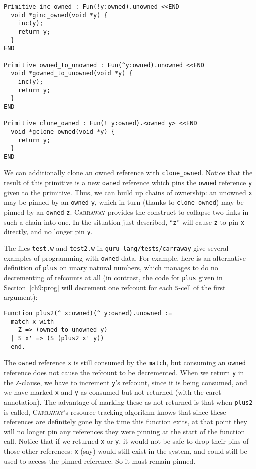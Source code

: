 \documentclass{book}[12pt]
\newcommand{\carraway}[0]{\textsc{Carraway}\xspace}
\begin{document}
\begin{verbatim}
Primitive inc_owned : Fun(!y:owned).unowned <<END
  void *ginc_owned(void *y) {
    inc(y);
    return y;
  }
END

Primitive owned_to_unowned : Fun(^y:owned).unowned <<END
  void *gowned_to_unowned(void *y) {
    inc(y);
    return y;
  }
END

Primitive clone_owned : Fun(! y:owned).<owned y> <<END
  void *gclone_owned(void *y) {
    return y;
  }
END
\end{verbatim}

\noindent 
We can additionally clone an owned reference with
\texttt{clone\_owned}.  Notice that the result of this primitive is a
new \texttt{owned} reference which pins the \texttt{owned} reference
\texttt{y} given to the primitive.  Thus, we can build up chains of
ownership: an unowned \texttt{x} may be pinned by an \texttt{owned}
\texttt{y}, which in turn (thanks to \texttt{clone\_owned}) may be
pinned by an \texttt{owned} \texttt{z}.  \carraway provides the \@
construct to collapse two links in such a chain into one.  In the
situation just described, ``\@ \texttt{z}'' will cause \texttt{z} to
pin \texttt{x} directly, and no longer pin \texttt{y}.

The files \texttt{test.w} and \texttt{test2.w} in
\texttt{guru-lang/tests/carraway} give several examples of programming
with \texttt{owned} data.  For example, here is an alternative
definition of \texttt{plus} on unary natural numbers, which manages to
do no decrementing of refcounts at all (in contrast, the code for
\texttt{plus} given in Section~\ref{ch9:prog} will decrement one
refcount for each \texttt{S}-cell of the first argument):

\begin{verbatim}
Function plus2(^ x:owned)(^ y:owned).unowned :=
  match x with
    Z => (owned_to_unowned y)
  | S x' => (S (plus2 x' y))
  end.
\end{verbatim}

\noindent The \texttt{owned} reference \texttt{x} is still consumed by
the \texttt{match}, but consuming an \texttt{owned} reference does not
cause the refcount to be decremented.  When we return \texttt{y} in
the \texttt{Z}-clause, we have to increment \texttt{y}'s refcount,
since it is being consumed, and we have marked \texttt{x} and
\texttt{y} as consumed but not returned (with the caret annotation).
The advantage of marking these as not returned is that when
\texttt{plus2} is called, \carraway's resource tracking algorithm
knows that since these references are definitely gone by the time this
function exits, at that point they will no longer pin any references
they were pinning at the start of the function call.  Notice that if
we returned \texttt{x} or \texttt{y}, it would not be safe to drop
their pins of those other references: \texttt{x} (say) would still
exist in the system, and could still be used to access the pinned
reference.  So it must remain pinned.

 
\end{document}
